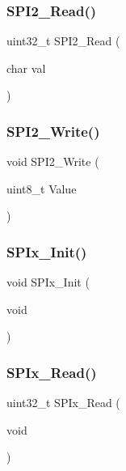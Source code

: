 \subsubsection{S\+P\+I2\+\_\+\+Read()}
{\footnotesize\ttfamily uint32\+\_\+t S\+P\+I2\+\_\+\+Read (\begin{DoxyParamCaption}\item[{char}]{val }\end{DoxyParamCaption})}

\mbox{\label{main_8c_a5db33ee89cceac02fd73ec5c03f3885a}} 
\subsubsection{S\+P\+I2\+\_\+\+Write()}
{\footnotesize\ttfamily void S\+P\+I2\+\_\+\+Write (\begin{DoxyParamCaption}\item[{uint8\+\_\+t}]{Value }\end{DoxyParamCaption})}

\mbox{\label{main_8c_af5bc1dbe25d33312b856902021750917}} 
\subsubsection{S\+P\+Ix\+\_\+\+Init()}
{\footnotesize\ttfamily void S\+P\+Ix\+\_\+\+Init (\begin{DoxyParamCaption}\item[{void}]{ }\end{DoxyParamCaption})}

\mbox{\label{main_8c_a9bd67ee9fc156393f37b7f4e5c511993}} 
\subsubsection{S\+P\+Ix\+\_\+\+Read()}
{\footnotesize\ttfamily uint32\+\_\+t S\+P\+Ix\+\_\+\+Read (\begin{DoxyParamCaption}\item[{void}]{ }\end{DoxyParamCaption})}

\mbox{\label{main_8c_a4203ff654ee25edcc0a27ac298260850}} 
